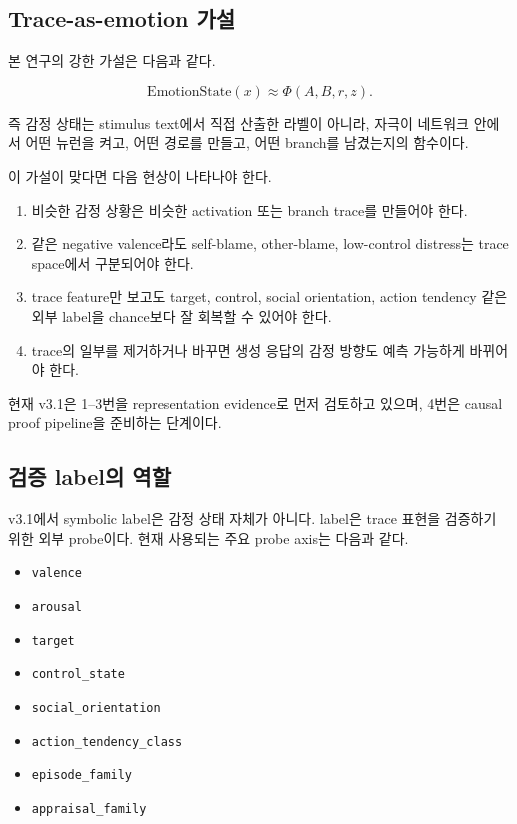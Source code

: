 \documentclass[11pt,a4paper]{article}
\begin{document}
\subsection{Trace-as-emotion 가설}

본 연구의 강한 가설은 다음과 같다.

\[
\mathrm{EmotionState}(x) \approx \Phi(A, B, r, z).
\]

즉 감정 상태는 stimulus text에서 직접 산출한 라벨이 아니라, 자극이 네트워크 안에서 어떤 뉴런을 켜고, 어떤 경로를 만들고, 어떤 branch를 남겼는지의 함수이다.

이 가설이 맞다면 다음 현상이 나타나야 한다.

\begin{enumerate}
  \item 비슷한 감정 상황은 비슷한 activation 또는 branch trace를 만들어야 한다.
  \item 같은 negative valence라도 self-blame, other-blame, low-control distress는 trace space에서 구분되어야 한다.
  \item trace feature만 보고도 target, control, social orientation, action tendency 같은 외부 label을 chance보다 잘 회복할 수 있어야 한다.
  \item trace의 일부를 제거하거나 바꾸면 생성 응답의 감정 방향도 예측 가능하게 바뀌어야 한다.
\end{enumerate}

현재 v3.1은 1--3번을 representation evidence로 먼저 검토하고 있으며, 4번은 causal proof pipeline을 준비하는 단계이다.

\subsection{검증 label의 역할}

v3.1에서 symbolic label은 감정 상태 자체가 아니다. label은 trace 표현을 검증하기 위한 외부 probe이다. 현재 사용되는 주요 probe axis는 다음과 같다.

\begin{itemize}
  \item \texttt{valence}
  \item \texttt{arousal}
  \item \texttt{target}
  \item \texttt{control\_state}
  \item \texttt{social\_orientation}
  \item \texttt{action\_tendency\_class}
  \item \texttt{episode\_family}
  \item \texttt{appraisal\_family}
\end{itemize}
\end{document}
